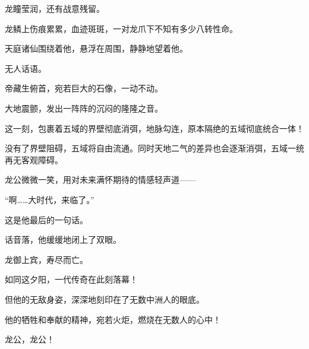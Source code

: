 \begin{this_body}
龙瞳莹润，还有战意残留。

龙鳞上伤痕累累，血迹斑斑，一对龙爪下不知有多少八转性命。

天庭诸仙围绕着他，悬浮在周围，静静地望着他。

无人话语。

帝藏生俯首，宛若巨大的石像，一动不动。

大地震颤，发出一阵阵的沉闷的隆隆之音。

这一刻，包裹着五域的界壁彻底消弭，地脉勾连，原本隔绝的五域彻底统合一体！

没有了界壁阻碍，五域将自由流通。同时天地二气的差异也会逐渐消弭，五域一统再无客观障碍。

龙公微微一笑，用对未来满怀期待的情感轻声道——

“啊……大时代，来临了。”

这是他最后的一句话。

话音落，他缓缓地闭上了双眼。

龙御上宾，寿尽而亡。

如同这夕阳，一代传奇在此刻落幕！

但他的无敌身姿，深深地刻印在了无数中洲人的眼底。

他的牺牲和奉献的精神，宛若火炬，燃烧在无数人的心中！

龙公，龙公！

\end{this_body}



